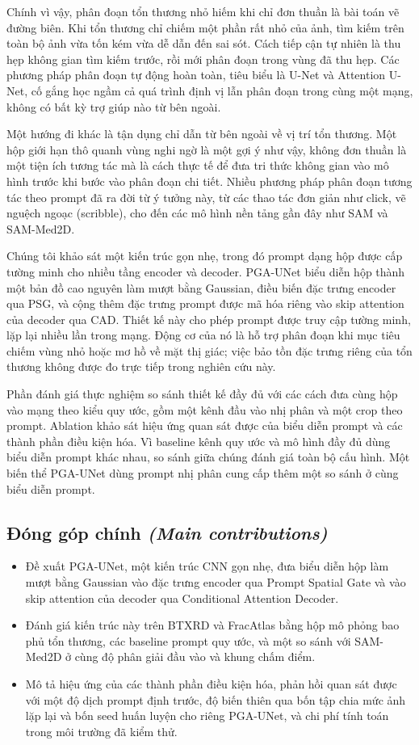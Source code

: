 \documentclass[11pt]{article}
\newcommand{\enlabel}[1]{{\small\itshape\color{gray} (#1)}}
\begin{document}
Chính vì vậy, phân đoạn tổn thương nhỏ hiếm khi chỉ đơn thuần là bài toán vẽ đường biên. Khi tổn thương chỉ chiếm một phần rất nhỏ của ảnh, tìm kiếm trên toàn bộ ảnh vừa tốn kém vừa dễ dẫn đến sai sót. Cách tiếp cận tự nhiên là thu hẹp không gian tìm kiếm trước, rồi mới phân đoạn trong vùng đã thu hẹp. Các phương pháp phân đoạn tự động hoàn toàn, tiêu biểu là U-Net và Attention U-Net, cố gắng học ngầm cả quá trình định vị lẫn phân đoạn trong cùng một mạng, không có bất kỳ trợ giúp nào từ bên ngoài.

Một hướng đi khác là tận dụng chỉ dẫn từ bên ngoài về vị trí tổn thương. Một hộp giới hạn thô quanh vùng nghi ngờ là một gợi ý như vậy, không đơn thuần là một tiện ích tương tác mà là cách thực tế để đưa tri thức không gian vào mô hình trước khi bước vào phân đoạn chi tiết. Nhiều phương pháp phân đoạn tương tác theo prompt đã ra đời từ ý tưởng này, từ các thao tác đơn giản như click, vẽ nguệch ngoạc (scribble), cho đến các mô hình nền tảng gần đây như SAM và SAM-Med2D.

Chúng tôi khảo sát một kiến trúc gọn nhẹ, trong đó prompt dạng hộp được cấp tường minh cho nhiều tầng encoder và decoder. PGA-UNet biểu diễn hộp thành một bản đồ cao nguyên làm mượt bằng Gaussian, điều biến đặc trưng encoder qua PSG, và cộng thêm đặc trưng prompt được mã hóa riêng vào skip attention của decoder qua CAD. Thiết kế này cho phép prompt được truy cập tường minh, lặp lại nhiều lần trong mạng. Động cơ của nó là hỗ trợ phân đoạn khi mục tiêu chiếm vùng nhỏ hoặc mơ hồ về mặt thị giác; việc bảo tồn đặc trưng riêng của tổn thương không được đo trực tiếp trong nghiên cứu này.

Phần đánh giá thực nghiệm so sánh thiết kế đầy đủ với các cách đưa cùng hộp vào mạng theo kiểu quy ước, gồm một kênh đầu vào nhị phân và một crop theo prompt. Ablation khảo sát hiệu ứng quan sát được của biểu diễn prompt và các thành phần điều kiện hóa. Vì baseline kênh quy ước và mô hình đầy đủ dùng biểu diễn prompt khác nhau, so sánh giữa chúng đánh giá toàn bộ cấu hình. Một biến thể PGA-UNet dùng prompt nhị phân cung cấp thêm một so sánh ở cùng biểu diễn prompt.

\subsection*{Đóng góp chính \enlabel{Main contributions}}
\begin{itemize}[leftmargin=1.4em]
\item Đề xuất PGA-UNet, một kiến trúc CNN gọn nhẹ, đưa biểu diễn hộp làm mượt bằng Gaussian vào đặc trưng encoder qua Prompt Spatial Gate và vào skip attention của decoder qua Conditional Attention Decoder.
\item Đánh giá kiến trúc này trên BTXRD và FracAtlas bằng hộp mô phỏng bao phủ tổn thương, các baseline prompt quy ước, và một so sánh với SAM-Med2D ở cùng độ phân giải đầu vào và khung chấm điểm.
\item Mô tả hiệu ứng của các thành phần điều kiện hóa, phản hồi quan sát được với một độ dịch prompt định trước, độ biến thiên qua bốn tập chia mức ảnh lặp lại và bốn seed huấn luyện cho riêng PGA-UNet, và chi phí tính toán trong môi trường đã kiểm thử.
\end{itemize}
\end{document}

